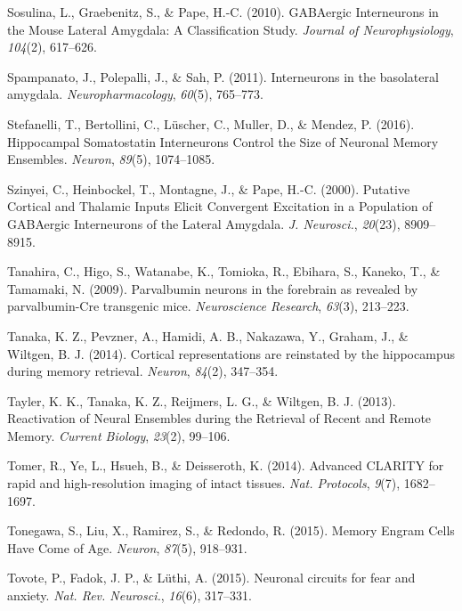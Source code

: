 \documentclass[12pt,a4paperpaper,]{report}
\begin{document}
\hypertarget{ref-sosulinaux5fgabaergicux5f2010}{}
Sosulina, L., Graebenitz, S., \& Pape, H.-C. (2010). GABAergic
Interneurons in the Mouse Lateral Amygdala: A Classification Study.
\emph{Journal of Neurophysiology}, \emph{104}(2), 617--626.

\hypertarget{ref-spampanatoux5finterneuronsux5f2011}{}
Spampanato, J., Polepalli, J., \& Sah, P. (2011). Interneurons in the
basolateral amygdala. \emph{Neuropharmacology}, \emph{60}(5), 765--773.

\hypertarget{ref-stefanelliux5fhippocampalux5f2016}{}
Stefanelli, T., Bertollini, C., Lüscher, C., Muller, D., \& Mendez, P.
(2016). Hippocampal Somatostatin Interneurons Control the Size of
Neuronal Memory Ensembles. \emph{Neuron}, \emph{89}(5), 1074--1085.

\hypertarget{ref-szinyeiux5fputativeux5f2000}{}
Szinyei, C., Heinbockel, T., Montagne, J., \& Pape, H.-C. (2000).
Putative Cortical and Thalamic Inputs Elicit Convergent Excitation in a
Population of GABAergic Interneurons of the Lateral Amygdala. \emph{J.
Neurosci.}, \emph{20}(23), 8909--8915.

\hypertarget{ref-tanahiraux5fparvalbuminux5f2009}{}
Tanahira, C., Higo, S., Watanabe, K., Tomioka, R., Ebihara, S., Kaneko,
T., \& Tamamaki, N. (2009). Parvalbumin neurons in the forebrain as
revealed by parvalbumin-Cre transgenic mice. \emph{Neuroscience
Research}, \emph{63}(3), 213--223.

\hypertarget{ref-tanakaux5fcorticalux5f2014}{}
Tanaka, K. Z., Pevzner, A., Hamidi, A. B., Nakazawa, Y., Graham, J., \&
Wiltgen, B. J. (2014). Cortical representations are reinstated by the
hippocampus during memory retrieval. \emph{Neuron}, \emph{84}(2),
347--354.

\hypertarget{ref-taylerux5freactivationux5f2013}{}
Tayler, K. K., Tanaka, K. Z., Reijmers, L. G., \& Wiltgen, B. J. (2013).
Reactivation of Neural Ensembles during the Retrieval of Recent and
Remote Memory. \emph{Current Biology}, \emph{23}(2), 99--106.

\hypertarget{ref-tomerux5fadvancedux5f2014}{}
Tomer, R., Ye, L., Hsueh, B., \& Deisseroth, K. (2014). Advanced CLARITY
for rapid and high-resolution imaging of intact tissues. \emph{Nat.
Protocols}, \emph{9}(7), 1682--1697.

\hypertarget{ref-tonegawaux5fmemoryux5f2015}{}
Tonegawa, S., Liu, X., Ramirez, S., \& Redondo, R. (2015). Memory Engram
Cells Have Come of Age. \emph{Neuron}, \emph{87}(5), 918--931.

\hypertarget{ref-tovoteux5fneuronalux5f2015}{}
Tovote, P., Fadok, J. P., \& Lüthi, A. (2015). Neuronal circuits for
fear and anxiety. \emph{Nat. Rev. Neurosci.}, \emph{16}(6), 317--331.
\end{document}
